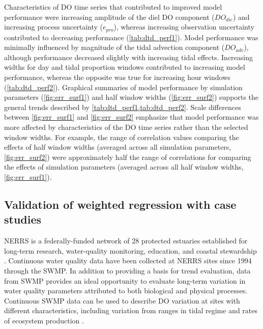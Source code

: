 \documentclass[letterpaper,12pt,oneside]{article}\usepackage[]{graphicx}\usepackage[]{color}
\begin{document}
Characteristics of \ac{DO} time series that contributed to improved model performance were increasing amplitude of the diel \ac{DO} component ($DO_{die}$) and increasing process uncertainty ($e_{pro}$), whereas increasing observation uncertainty contributed to decreasing performance (\cref{tab:dtd_perf1}).  Model performance was minimally influenced by magnitude of the tidal advection component ($DO_{adv}$), although performance decreased slightly with increasing tidal effects.  Increasing widths for day and tidal proportion windows contributed to increasing model performance, whereas the opposite was true for increasing hour windows (\cref{tab:dtd_perf2}).  Graphical summaries of model performance by simulation parameters (\cref{fig:err_surf1}) and half window widths (\cref{fig:err_surf2}) supports the general trends described by \cref{tab:dtd_perf1,tab:dtd_perf2}.  Scale differences between \cref{fig:err_surf1} and \cref{fig:err_surf2} emphasize that model performance was more affected by characteristics of the \ac{DO} time series rather than the selected window widths.  For example, the range of correlation values comparing the effects of half window widths (averaged across all simulation parameters, \cref{fig:err_surf2}) were approximately half the range of correlations for comparing the effects of simulation parameters (averaged across all half window widths, \cref{fig:err_surf1}).
 
\subsection{Validation of weighted regression with case studies}

\ac{NERRS} is a federally-funded network of 28 protected estuaries established for long-term research, water-quality monitoring, education, and coastal stewardship \citep{Wenner04}.  Continuous water quality data have been collected at \ac{NERRS} sites since 1994 through the \ac{SWMP}.  In addition to providing a basis for trend evaluation, data from \ac{SWMP} provides an ideal opportunity to evaluate long-term variation in water quality parameters attributed to both biological and physical processes.  Continuous \ac{SWMP} data can be used to describe \ac{DO} variation at sites with different characteristics, including variation from ranges in tidal regime \citep{Sanger02} and rates of ecosystem production \citep{Caffrey03,Caffrey04}.  
\end{document}
